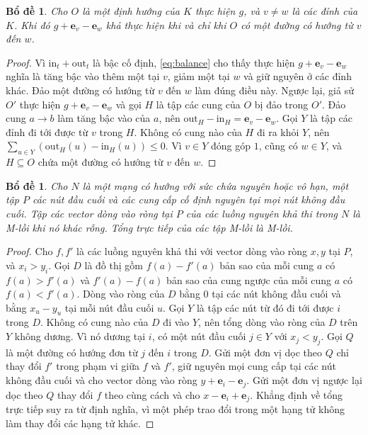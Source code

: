 \documentclass[pdflatex,sn-mathphys-num]{sn-jnl}
\theoremstyle{thmstyleone}%
\newtheorem{lemma}[theorem]{Bổ đề}%
\theoremstyle{thmstyletwo}%
\theoremstyle{thmstylethree}%
\newcommand{\e}{\mathbf{e}}
\newcommand{\out}{\mathrm{out}}
\newcommand{\inn}{\mathrm{in}}
\begin{document}
\begin{lemma}\label{lem:reversal}
Cho $O$ là một định hướng của $K$ thực hiện $g$, và $v\ne w$ là các đỉnh của $K$. Khi đó $g+\e_v-\e_w$ khả thực hiện khi và chỉ khi $O$ có một đường có hướng từ $v$ đến $w$.
\end{lemma}

\begin{proof}
Vì $\inn_t+\out_t$ là bậc cố định, \eqref{eq:balance} cho thấy thực hiện $g+\e_v-\e_w$ nghĩa là tăng bậc vào thêm một tại $v$, giảm một tại $w$ và giữ nguyên ở các đỉnh khác. Đảo một đường có hướng từ $v$ đến $w$ làm đúng điều này. Ngược lại, giả sử $O'$ thực hiện $g+\e_v-\e_w$ và gọi $H$ là tập các cung của $O$ bị đảo trong $O'$. Đảo cung $a\to b$ làm tăng bậc vào của $a$, nên $\out_H-\inn_H=\e_v-\e_w$. Gọi $Y$ là tập các đỉnh đi tới được từ $v$ trong $H$. Không có cung nào của $H$ đi ra khỏi $Y$, nên $\sum_{u\in Y}(\out_H(u)-\inn_H(u))\le0$. Vì $v\in Y$ đóng góp $1$, cũng có $w\in Y$, và $H\subseteq O$ chứa một đường có hướng từ $v$ đến $w$.
\end{proof}

\begin{lemma}\label{lem:boundary}
Cho $N$ là một mạng có hướng với sức chứa nguyên hoặc vô hạn, một tập $P$ các nút đầu cuối và các cung cấp \emph{cố định} nguyên tại mọi nút không đầu cuối. Tập các vector dòng vào ròng tại $P$ của các luồng nguyên khả thi trong $N$ là M-lồi khi nó khác rỗng. Tổng trực tiếp của các tập M-lồi là M-lồi.
\end{lemma}

\begin{proof}
Cho $f,f'$ là các luồng nguyên khả thi với vector dòng vào ròng $x,y$ tại $P$, và $x_i>y_i$. Gọi $D$ là đồ thị gồm $f(a)-f'(a)$ bản sao của mỗi cung $a$ có $f(a)>f'(a)$ và $f'(a)-f(a)$ bản sao của cung ngược của mỗi cung $a$ có $f(a)<f'(a)$. Dòng vào ròng của $D$ bằng $0$ tại các nút không đầu cuối và bằng $x_u-y_u$ tại mỗi nút đầu cuối $u$. Gọi $Y$ là tập các nút từ đó đi tới được $i$ trong $D$. Không có cung nào của $D$ đi vào $Y$, nên tổng dòng vào ròng của $D$ trên $Y$ không dương. Vì nó dương tại $i$, có một nút đầu cuối $j\in Y$ với $x_j<y_j$. Gọi $Q$ là một đường có hướng đơn từ $j$ đến $i$ trong $D$. Gửi một đơn vị dọc theo $Q$ chỉ thay đổi $f'$ trong phạm vi giữa $f$ và $f'$, giữ nguyên mọi cung cấp tại các nút không đầu cuối và cho vector dòng vào ròng $y+\e_i-\e_j$. Gửi một đơn vị ngược lại dọc theo $Q$ thay đổi $f$ theo cùng cách và cho $x-\e_i+\e_j$. Khẳng định về tổng trực tiếp suy ra từ định nghĩa, vì một phép trao đổi trong một hạng tử không làm thay đổi các hạng tử khác.
\end{proof}
\end{document}
